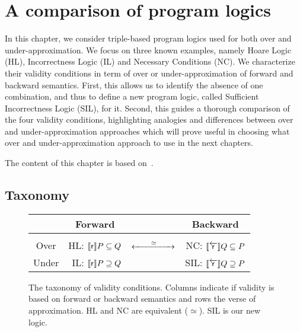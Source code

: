 
\chapter{A comparison of program logics}\label{ch:sil}
In this chapter, we consider triple-based program logics used for both over and under-approximation. We focus on three known examples, namely Hoare Logic (HL), Incorrectness Logic (IL) and Necessary Conditions (NC). We characterize their validity conditions in term of over or under-approximation of forward and backward semantics. First, this allows us to identify the absence of one combination, and thus to define a new program logic, called Sufficient Incorrectness Logic (SIL), for it. Second, this guides a thorough comparison of the four validity conditions, highlighting analogies and differences between over and under-approximation approaches which will prove useful in choosing what over and under-approximation approach to use in the next chapters.

The content of this chapter is based on~\cite{ABGL24}.

\section{Taxonomy}
\begin{figure}[t]
	\centering

	\begin{tabular}{@{\quad}c@{\quad}|@{\quad}rcr@{\quad}}
		       & \multicolumn{1}{c}{Forward}             &                                        & \multicolumn{1}{c}{Backward}                                 \\[3pt]
		\hline &                                         &                                        &                                                              \\[-5pt]
		Over   & HL: \quad $\llbracket\mathsf{r}\rrbracket P \subseteq Q$ & $\xleftrightarrow{\qquad\simeq\qquad}$ & NC: \quad $\llbracket\overleftarrow{\mathsf{r}}\rrbracket Q \subseteq P$                       \\[5pt]
		Under  & IL: \quad $\llbracket\mathsf{r}\rrbracket P \supseteq Q$  &                                        & \textcolor{ACMBlue}{SIL: \quad $\llbracket\overleftarrow{\mathsf{r}}\rrbracket Q \supseteq P$}
	\end{tabular}
	\caption{The taxonomy of validity conditions. Columns indicate if validity is based on forward or backward semantics and rows the verse of approximation. HL and NC are equivalent ($\simeq$). SIL is our new logic.}
	\label{fig:sil:taxonomy}
\end{figure}

